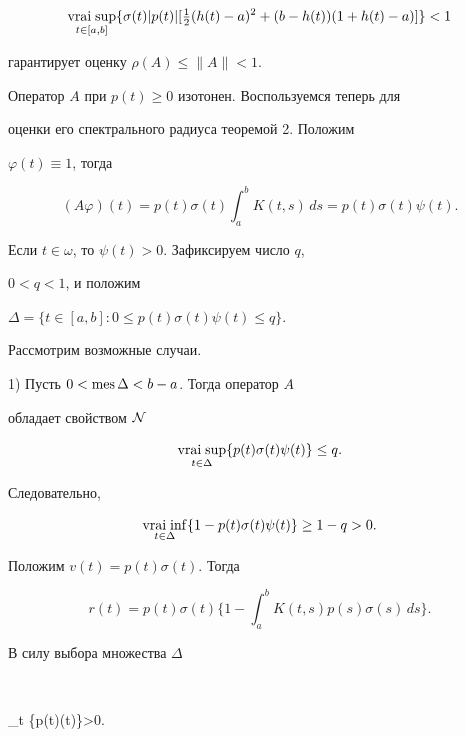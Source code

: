 \begin{exam}
\begin{equation}


\vraisup_{t\in[a,b]}\{\sigma(t) |p(t)|


[\tfrac{1}{2} (h(t)-a)^2 + (b-h(t))(1+h(t)-a)]\} <1


\end{equation}


гарантирует оценку $\rho(A)\leq \|A\|<1$.





Оператор $A$ при $p(t)\geq 0$ изотонен. Воспользуемся теперь для


оценки его спектрального радиуса теоремой 2. Положим


$\varphi(t)\equiv 1$, тогда


$$


(A\varphi)(t) = p(t)\sigma(t)\int_a^bK(t,s)\,ds = p(t) \sigma(t)\psi(t).


$$


Если $t\in\omega$, то $\psi(t)>0$. Зафиксируем число $q$,


$0<q<1$, и положим


$\Delta=\{t\in[a,b]:0\leq p(t)\sigma(t)\psi(t)\leq q\}$.





Рассмотрим возможные случаи.





1) Пусть $0< \operatorname{mes}\Delta<b-a$. Тогда оператор $A$


обладает свойством $\cal N$


$$


\vraisup_{t\in\Delta} \{p(t)\sigma(t) \psi(t)\}\leq q.


$$


Следовательно,


$$


\vraiinf_{t\in\Delta}\{1-p(t)\sigma(t)\psi(t)\}\geq 1-q>0.


$$





Положим $v(t)=p(t)\sigma(t)$. Тогда


$$


r(t)= p(t)\sigma(t)\bigg\{1-\int_a^bK(t,s)p(s)\sigma(s)\,ds\bigg\}.


$$


В силу выбора множества $\Delta$


$$


\vraiinf_{t\in[a,b]\setminus\Delta} \{p(t)\sigma(t)\}>0.



\end{exam}
